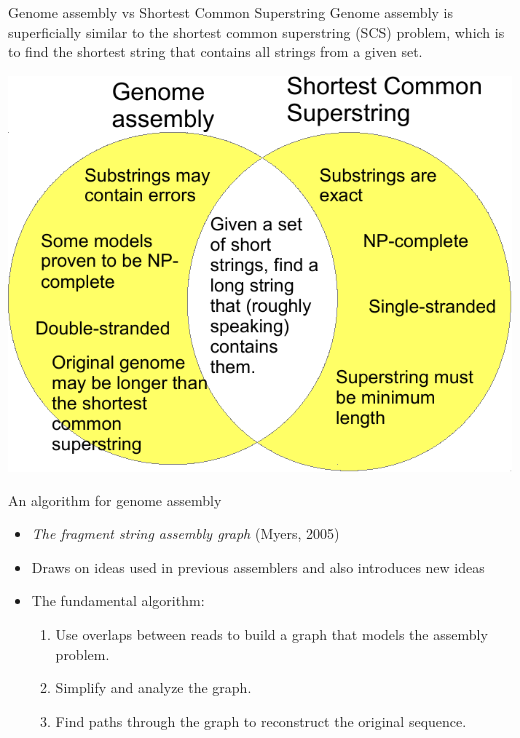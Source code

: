 \documentclass[xcolor=dvipsnames]{beamer}
\begin{document}
\begin{frame}{Genome assembly vs Shortest Common Superstring}
	Genome assembly is superficially similar to the shortest common superstring
	(SCS) problem, which is to find the shortest string that contains all strings
	from a given set.
	\begin{center}
	\includegraphics[scale=0.6]{venn-crop.pdf}
	\end{center}
\end{frame}

\begin{frame}{An algorithm for genome assembly}

	\begin{itemize}
		\item {\it The fragment string assembly graph} (Myers, 2005)
		\item Draws on ideas used in previous assemblers and also introduces new
		ideas
		\item The fundamental algorithm:
		\begin{enumerate}
			\item Use overlaps between reads to build a graph that models the
			assembly problem.
			\item Simplify and analyze the graph.
			\item Find paths through the graph to reconstruct the original
			sequence.
		\end{enumerate}
	\end{itemize}
\end{frame}
\end{document}
